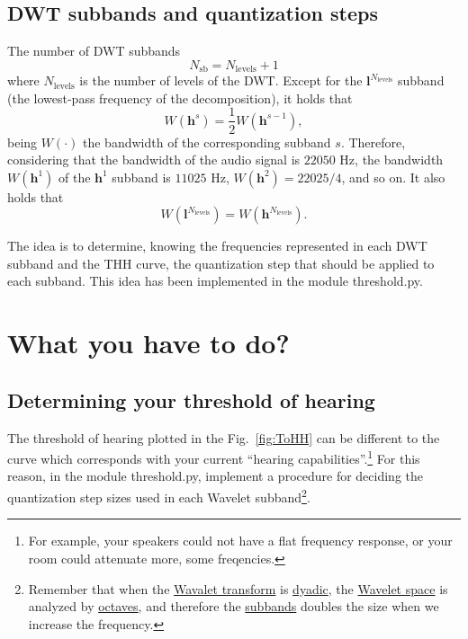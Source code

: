 \subsection{DWT subbands and quantization steps}
The number of DWT subbands
\begin{equation}
  N_{\text{sb}} = N_{\text{levels}} + 1
\end{equation}
where $N_{\text{levels}}$ is the number of levels of the DWT. Except
for the ${\mathbf l}^{N_{\text{levels}}}$ subband (the lowest-pass
frequency of the decomposition), it holds that
\begin{equation}
  W({\mathbf h}^s) = \frac{1}{2}W({\mathbf h}^{s-1}),
\end{equation}
being $W(\cdot)$ the bandwidth of the corresponding
subband $s$. Therefore, considering that the bandwidth of the audio signal
is $22050$ Hz, the bandwidth $W({\mathbf h}^1)$ of the ${\mathbf h}^1$ subband is $11025$ Hz,
$W({\mathbf h} ^2)=22025/4$, and so on. It also holds that
\begin{equation}
  W({\mathbf l}^{N_{\text{levels}}}) = W({\mathbf h}^{N_{\text{levels}}}).
\end{equation}

The idea is to determine, knowing the frequencies represented in each
DWT subband and the THH curve, the quantization step that should be
applied to each subband. This idea has been implemented in the module
threshold.py.

\section{What you have to do?}

\subsection{Determining your threshold of hearing}

The threshold of hearing plotted in the Fig.~\ref{fig:ToHH} can be
different to the curve which corresponds with your current ``hearing
capabilities''.\footnote{For example, your speakers could not have a
flat frequency response, or your room could attenuate more, some
freqencies.} For this reason, in the module threshold.py, implement a
procedure for deciding the quantization step sizes used in each
Wavelet subband\footnote{Remember that when the
\href{https://en.wikipedia.org/wiki/Wavelet_transform}{Wavalet
  transform} is
\href{https://en.wikipedia.org/wiki/Dyadic_rational}{dyadic}, the
\href{https://en.wikipedia.org/wiki/Discrete_wavelet_transform}{Wavelet
  space} is analyzed by
\href{https://en.wikipedia.org/wiki/Octave_band}{octaves}, and
therefore the
\href{https://en.wikipedia.org/wiki/Filter_bank}{subbands} doubles the
size when we increase the frequency.}.
  
